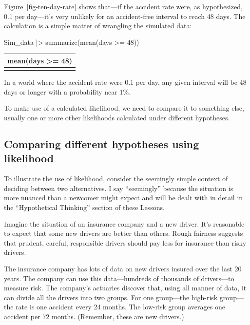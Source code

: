 \documentclass[
  letterpaper,
  DIV=11,
  numbers=noendperiod,
  oneside]{scrartcl}
\newenvironment{Shaded}{\begin{snugshade}}{\end{snugshade}}
\newcommand{\DecValTok}[1]{\textcolor[rgb]{0.68,0.00,0.00}{#1}}
\newcommand{\FunctionTok}[1]{\textcolor[rgb]{0.28,0.35,0.67}{#1}}
\newcommand{\NormalTok}[1]{\textcolor[rgb]{0.00,0.23,0.31}{#1}}
\newcommand{\SpecialCharTok}[1]{\textcolor[rgb]{0.37,0.37,0.37}{#1}}
\begin{document}
Figure~\ref{fig-ten-day-rate} shows that---if the accident rate were, as
hypothesized, 0.1 per day---it's very unlikely for an accident-free
interval to reach 48 days. The calculation is a simple matter of
wrangling the simulated data:

\begin{Shaded}
\begin{Highlighting}[]
\NormalTok{Sim\_data }\SpecialCharTok{|\textgreater{}} \FunctionTok{summarize}\NormalTok{(}\FunctionTok{mean}\NormalTok{(days }\SpecialCharTok{\textgreater{}=} \DecValTok{48}\NormalTok{))}
\end{Highlighting}
\end{Shaded}

\begin{longtable}[]{@{}c@{}}
\toprule\noalign{}
mean(days \textgreater= 48) \\
\midrule\noalign{}
\endhead
\bottomrule\noalign{}
\endlastfoot
0.0067 \\
\end{longtable}

In a world where the accident rate were 0.1 per day, any given interval
will be 48 days or longer with a probability near 1\%.

To make use of a calculated likelihood, we need to compare it to
something else, usually one or more other likelihoods calculated under
different hypotheses.

\subsection{Comparing different hypotheses using
likelihood}\label{sec-comparing-likelihoods}

To illustrate the use of likelihood, consider the seemingly simple
context of deciding between two alternatives. I say ``seemingly''
because the situation is more nuanced than a newcomer might expect and
will be dealt with in detail in the ``Hypothetical Thinking'' section of
these Lessons.

Imagine the situation of an insurance company and a new driver. It's
reasonable to expect that some new drivers are better than others. Rough
fairness suggests that prudent, careful, responsible drivers should pay
less for insurance than risky drivers.

The insurance company has lots of data on new drivers insured over the
last 20 years. The company can use this data---hundreds of thousands of
drivers---to measure risk. The company's actuaries discover that, using
all manner of data, it can divide all the drivers into two groups. For
one group---the high-risk group---the rate is one accident every 24
months. The low-risk group averages one accident per 72 months.
(Remember, these are new drivers.)
\end{document}
